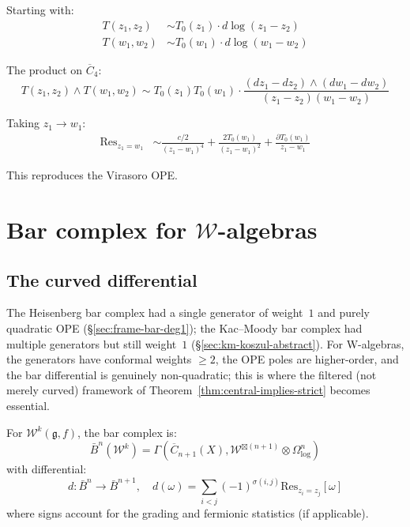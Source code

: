 \begin{computation}
Starting with:
\begin{align}
T(z_1, z_2) &\sim T_0(z_1) \cdot d\log(z_1-z_2) \\
T(w_1, w_2) &\sim T_0(w_1) \cdot d\log(w_1-w_2)
\end{align}

The product on $\overline{C}_4$:
\begin{equation}
T(z_1,z_2) \wedge T(w_1,w_2) \sim T_0(z_1) T_0(w_1) \cdot \frac{(dz_1-dz_2) \wedge (dw_1-dw_2)}{(z_1-z_2)(w_1-w_2)}
\end{equation}

Taking $z_1 \to w_1$:
\begin{align}
\mathrm{Res}_{z_1=w_1} &\sim \frac{c/2}{(z_1-w_1)^4} + \frac{2T_0(w_1)}{(z_1-w_1)^2} + \frac{\partial T_0(w_1)}{z_1-w_1}
\end{align}

This reproduces the Virasoro OPE.
\end{computation}

\section{Bar complex for $\mathcal{W}$-algebras}

\subsection{The curved differential}

The Heisenberg bar complex had a single generator of weight~$1$ and purely quadratic OPE (\S\ref{sec:frame-bar-deg1}); the Kac--Moody bar complex had multiple generators but still weight~$1$ (\S\ref{sec:km-koszul-abstract}).  For W-algebras, the generators have conformal weights $\geq 2$, the OPE poles are higher-order, and the bar differential is genuinely non-quadratic; this is where the filtered (not merely curved) framework of Theorem~\ref{thm:central-implies-strict} becomes essential.

\begin{definition}\label{def:w-bar-complex}
For $\mathcal{W}^k(\mathfrak{g}, f)$, the bar complex is:
\begin{equation}
\bar{B}^n(\mathcal{W}^k) = \Gamma\left(\overline{C}_{n+1}(X), \mathcal{W}^{\boxtimes (n+1)} \otimes \Omega^n_{\log}\right)
\end{equation}
with differential:
\begin{equation}
d: \bar{B}^n \to \bar{B}^{n+1}, \quad d(\omega) = \sum_{i<j} (-1)^{\sigma(i,j)} \mathrm{Res}_{z_i=z_j}[\omega]
\end{equation}
where signs account for the grading and fermionic statistics (if applicable).
\end{definition}

